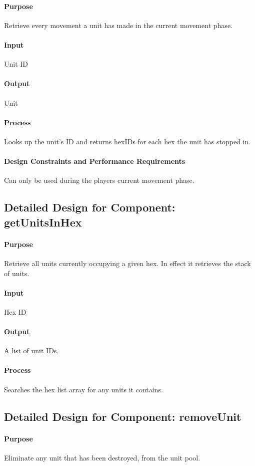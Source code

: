 \documentclass[12pt,a4paper,titlepage]{article}
\begin{document}
\paragraph{Purpose} Retrieve every movement a unit has made in the current movement phase.
\paragraph{Input} Unit ID
\paragraph{Output} Unit
\paragraph{Process} Looks up the unit's ID and returns hexIDs for each hex the unit has stopped in.
\paragraph{Design Constraints and Performance Requirements} Can only be used during the players current movement phase.

\subsection{Detailed Design for Component: getUnitsInHex}
\paragraph{Purpose} Retrieve all units currently occupying a given hex.  In effect it retrieves the stack of units.
\paragraph{Input} Hex ID
\paragraph{Output} A list of unit IDs.
\paragraph{Process} Searches the hex list array for any units it contains.

\subsection{Detailed Design for Component: removeUnit}
\paragraph{Purpose} Eliminate any unit that has been destroyed, from the unit pool.
\end{document}
